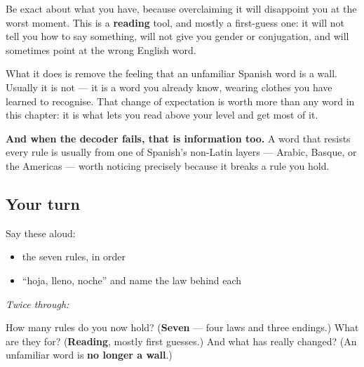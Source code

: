 \begin{grammarlens}[title={Grammar Lens: what a decoder is not}]
Be exact about what you have, because overclaiming it will disappoint you at the worst moment. This is a \textbf{reading} tool, and mostly a first-guess one: it will not tell you how to say something, will not give you gender or conjugation, and will sometimes point at the wrong English word.

What it does is remove the feeling that an unfamiliar Spanish word is a wall. Usually it is not — it is a word you already know, wearing clothes you have learned to recognise. That change of expectation is worth more than any word in this chapter: it is what lets you read above your level and get most of it.

\textbf{And when the decoder fails, that is information too.} A word that resists every rule is usually from one of Spanish's non-Latin layers — Arabic, Basque, or the Americas — worth noticing precisely because it breaks a rule you hold.
\end{grammarlens}

\subsection*{Your turn}
Say these aloud:

\begin{itemize}
\raggedright
  \item the seven rules, in order
  \item \textquotedblleft{}hoja, lleno, noche\textquotedblright{} and name the law behind each
\end{itemize}

\emph{Twice through:}

\begin{tcolorbox}[breakable,colback=teal!4,colframe=teal!35!black,title={Before you move on}]
How many rules do you now hold? (\textbf{Seven} — four laws and three endings.) What are they for? (\textbf{Reading}, mostly first guesses.) And what has really changed? (An unfamiliar word is \textbf{no longer a wall}.)
\end{tcolorbox}
